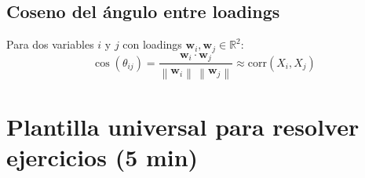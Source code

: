 \documentclass[11pt,a4paper]{article}
\newcommand{\R}{\mathbb{R}}
\newcommand{\norm}[1]{\left\lVert#1\right\rVert}
\begin{document}
\subsection{Coseno del ángulo entre loadings}

\begin{formulabox}
Para dos variables $i$ y $j$ con loadings $\mathbf{w}_i, \mathbf{w}_j \in \R^2$:
\[
\cos(\theta_{ij}) = \frac{\mathbf{w}_i \cdot \mathbf{w}_j}{\norm{\mathbf{w}_i}\,\norm{\mathbf{w}_j}} \approx \mathrm{corr}(X_i, X_j)
\]
\end{formulabox}

\section{Plantilla universal para resolver ejercicios (5 min)}
\end{document}
